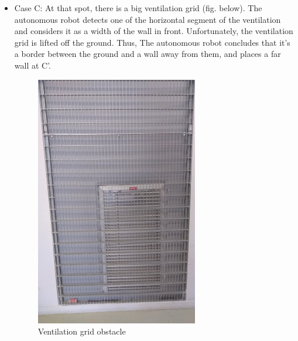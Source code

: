 \documentclass[12pt]{report}
\begin{document}
\begin{itemize}
		
		\item Case C: At that spot, there is a big ventilation grid (fig. below). The autonomous robot detects one of the horizontal segment of the ventilation and considers it as a width of the wall in front. Unfortunately, the ventilation grid is lifted off the ground. Thus, The autonomous robot concludes that it's a border between the ground and a wall away from them, and places a far wall at C'.
	\begin{figure}[H]
	\begin{center}
		\includegraphics[scale=0.60]{res/grid_vent.png}
		\caption{Ventilation grid obstacle}
	\end{center}
\end{figure}
	

\end{itemize}
\end{document}
